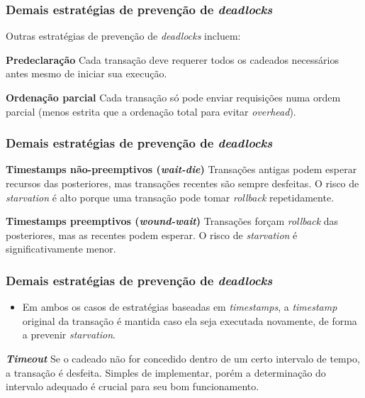 \documentclass{beamer}
\begin{document}
\begin{frame} %
    \frametitle{Demais estratégias de prevenção de \emph{deadlocks}}
    Outras estratégias de prevenção de \emph{deadlocks} incluem:

    \medskip
    \begin{block}{\textbf{Predeclaração}}
        Cada transação deve requerer todos os cadeados necessários antes mesmo de iniciar sua execução.
    \end{block}

    \medskip
    \begin{block}{\textbf{Ordenação parcial}}
        Cada transação só pode enviar requisições numa ordem parcial (menos estrita que a ordenação total para evitar \emph{overhead}).
    \end{block}
\end{frame}


\begin{frame} %
    \frametitle{Demais estratégias de prevenção de \emph{deadlocks}}
    
    \begin{block}{\textbf{Timestamps não-preemptivos (\emph{wait-die})}}
        Transações antigas podem esperar recursos das posteriores, mas transações recentes são sempre desfeitas. O risco de \emph{starvation} é alto porque uma transação pode tomar \emph{rollback} repetidamente.
    \end{block}

    \medskip
    \begin{block}{\textbf{Timestamps preemptivos (\emph{wound-wait})}}
        Transações forçam \emph{rollback} das posteriores, mas as recentes podem esperar. O risco de \emph{starvation} é significativamente menor.
    \end{block}

\end{frame}


\begin{frame} %
    \frametitle{Demais estratégias de prevenção de \emph{deadlocks}}

    \begin{itemize}
        \item Em ambos os casos de estratégias baseadas em \emph{timestamps}, a \emph{timestamp} original da transação é mantida caso ela seja executada novamente, de forma a prevenir \emph{starvation}.
    \end{itemize}

    \medskip
    \begin{block}{\textbf{\emph{Timeout}}}
        Se o cadeado não for concedido dentro de um certo intervalo de tempo, a transação é desfeita. Simples de implementar, porém a determinação do intervalo adequado é crucial para seu bom funcionamento.
    \end{block}
    
\end{frame}
\end{document}
